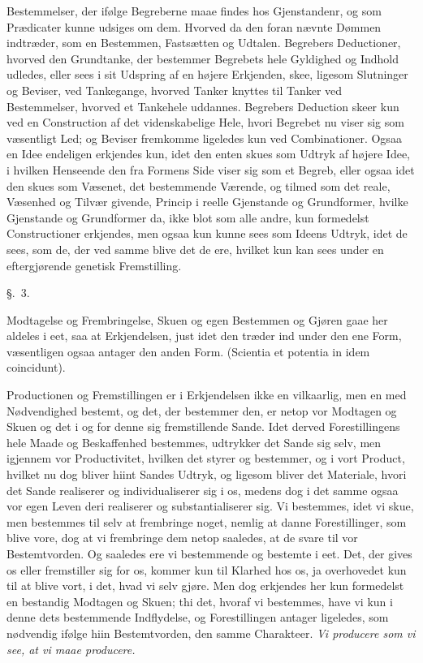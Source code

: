 \documentclass[12pt,a4paper]{book}
\newcommand{\apage}[1]{\marginnote{\footnotesize\textit{[#1]}}}
\begin{document}
Bestemmelser, der ifølge Begreberne maae findes hos Gjenstandenr,%
 og som Prædicater kunne udsiges om dem. Hvorved da den foran nævnte Dømmen
indtræder, som en Bestemmen, Fastsætten og Udtalen. Begrebers Deductioner,
hvorved den Grundtanke, der bestemmer Begrebets \apage{23}  hele Gyldighed og Indhold
udledes, eller sees i sit Udspring af en højere Erkjenden, skee, ligesom
Slutninger og Beviser, ved Tankegange, hvorved Tanker knyttes til Tanker ved
Bestemmelser, hvorved et Tankehele uddannes. Begrebers Deduction skeer kun ved
en Construction af det videnskabelige Hele, hvori Begrebet nu viser sig som
væsentligt Led; og Beviser fremkomme ligeledes kun ved Combinationer. Ogsaa en
Idee endeligen erkjendes kun, idet den enten skues som Udtryk af højere Idee, i
hvilken Henseende den fra Formens Side viser sig som et Begreb, eller ogsaa idet
den skues som Væsenet, det bestemmende Værende, og tilmed som det reale,
Væsenhed og Tilvær givende, Princip i reelle Gjenstande og Grundformer, hvilke
Gjenstande og Grundformer da, ikke blot som alle andre, kun formedelst
Constructioner erkjendes, men ogsaa kun kunne sees som Ideens Udtryk, idet de
sees, som de, der ved samme blive det de ere, hvilket kun kan sees under en
eftergjørende genetisk Fremstilling.

\begin{center}\large\S.~3.\end{center} \apage{24} 

Modtagelse og Frembringelse, Skuen og egen Bestemmen og Gjøren gaae her aldeles
i eet, saa at Erkjendelsen, just idet den træder ind under den ene Form,
væsentligen ogsaa antager den anden Form. (Scientia et potentia in idem
coincidunt).

Productionen og Fremstillingen er i Erkjendelsen ikke en vilkaarlig, men en med
Nødvendighed bestemt, og det, der bestemmer den, er netop vor Modtagen og Skuen
og det i og for denne sig fremstillende Sande. Idet derved Forestillingens hele
Maade og Beskaffenhed bestemmes, udtrykker det Sande sig selv, men igjennem vor
Productivitet, hvilken det styrer og bestemmer, og i vort Product, hvilket nu dog
bliver hiint Sandes Udtryk, og ligesom bliver det Materiale, hvori det Sande
realiserer og individualiserer sig i os, medens dog i det samme ogsaa vor egen
Leven deri realiserer og substantialiserer sig. Vi bestemmes, idet vi skue, men
bestemmes til selv at frembringe noget, nemlig at danne Forestillinger, som
blive vore, dog at vi frembringe dem netop saaledes, at de svare til vor
Bestemtvorden. Og saaledes ere vi bestemmende og bestemte i eet. Det, der gives
os eller fremstiller sig for os, kommer kun til Klarhed hos os, ja overhovedet
kun til at blive vort, i det, hvad vi selv gjøre. Men dog erkjendes her kun
formedelst en bestandig Modtagen og Skuen; thi det, hvoraf vi bestemmes, have vi
kun i denne \apage{25} dets bestemmende Indflydelse, og Forestillingen antager ligeledes,
som nødvendig ifølge hiin Bestemtvorden, den samme Charakteer. \emph{Vi producere
som vi see, at vi maae producere.}
\end{document}
